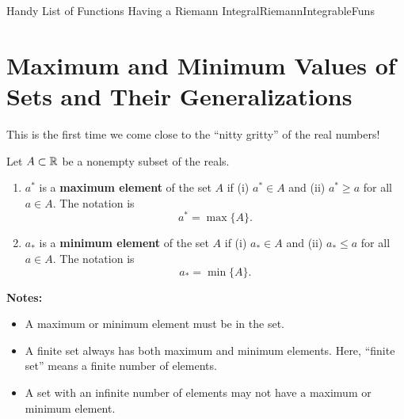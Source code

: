 \begin{propColor}{Handy List of Functions Having a Riemann Integral}{RiemannIntegrableFuns}
\end{propColor}

\bigskip



\section{Maximum and Minimum Values of Sets and Their Generalizations}

This is the first time we come close to the ``nitty gritty'' of the real numbers! 

\begin{tcolorbox}[colback=mylightblue, title = {\bf Max and Min Values of a Set}, breakable]
\begin{definition}
\label{def:MaxMinOfSets}
Let $A \subset \mathbb R$ be a nonempty subset of the reals.

\begin{enumerate}
\renewcommand{\labelenumi}{(\alph{enumi})}
\setlength{\itemsep}{.2cm}
    \item  $a^\ast$ is a \textbf{maximum element} of the set $A$ if (i) $a^\ast \in A$ and (ii) $a^\ast \ge a$ for all $a \in A$. The notation is
    $$a^\ast = \max\{A\}. $$

    \item  $a_\ast$ is a \textbf{minimum element} of the set $A$ if (i) $a_\ast \in A$ and (ii) $a_\ast \le a$ for all $a \in A$. The notation is
    $$a_\ast = \min\{A\}. $$
\end{enumerate}

\end{definition}
\textbf{Notes:}
\begin{itemize}

    \item A maximum or minimum element must be in the set.  

    \item A finite set always has both maximum and minimum elements. Here, ``finite set'' means a finite number of elements.

   \item A set with an infinite number of elements may not have a maximum or minimum element. 
\end{itemize}
\end{tcolorbox}

\bigskip

